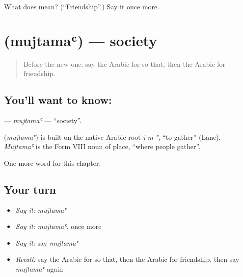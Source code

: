 \begin{tcolorbox}[breakable,colback=teal!4,colframe=teal!35!black,title={Before you move on}]
What does  mean? (\textquotedblleft{}Friendship\textquotedblright{}.) Say it once more.
\end{tcolorbox}
\section[\texorpdfstring{\ar{مجتمع} (mujtamaʿ)}{مجتمع (mujtamaʿ)}]{ (mujtamaʿ) — society}

\label{lesson:AR-C175-mujtama}



\begin{quote}
Before the new one: say the Arabic for so that, then the Arabic for friendship.
\end{quote}

\subsection*{You'll want to know: }
\textbf{} — \emph{mujtamaʿ} — \textquotedblleft{}society\textquotedblright{}.

\begin{cousinweb}
\textbf{} (\emph{mujtamaʿ}) is built on the native Arabic root \emph{j-m-ʿ}, \textquotedblleft{}to gather\textquotedblright{} (Lane). \emph{Mujtamaʿ} is the Form VIII noun of place, \textquotedblleft{}where people gather\textquotedblright{}.
\end{cousinweb}

\begin{grammarlens}[title={What you've built}]
One more word for this chapter.
\end{grammarlens}

\subsection*{Your turn}
\begin{itemize}
\raggedright
  \item \emph{Say it:} \emph{mujtamaʿ}
  \item \emph{Say it:} \emph{mujtamaʿ}, once more
  \item \emph{Say it:} say \emph{mujtamaʿ}
  \item \emph{Recall:} say the Arabic for so that, then the Arabic for friendship, then say \emph{mujtamaʿ} again
\end{itemize}

